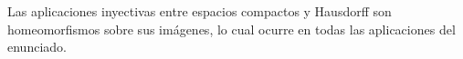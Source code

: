 \documentclass[twoside]{article}
\begin{document}
\begin{solucion}
Las aplicaciones  inyectivas entre espacios compactos y Hausdorff son homeomorfismos sobre sus imágenes, lo cual ocurre en todas las aplicaciones del enunciado. 
%
%
%
%



\end{solucion}
\end{document}
